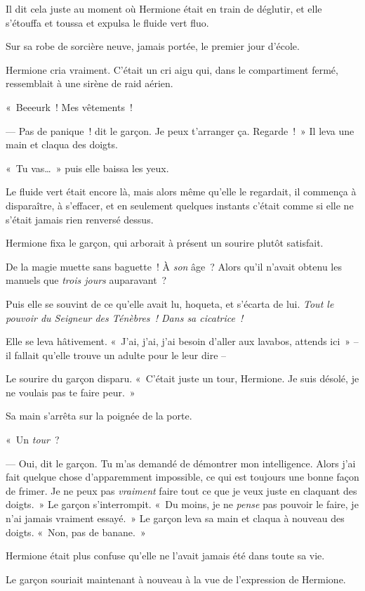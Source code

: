 Il dit cela juste au moment où Hermione était en train de déglutir, et elle s'étouffa et toussa et expulsa le fluide vert fluo.

Sur sa robe de sorcière neuve, jamais portée, le premier jour d'école.

Hermione cria vraiment. C'était un cri aigu qui, dans le compartiment fermé, ressemblait à une sirène de raid aérien.

«~Beeeurk~! Mes vêtements~!

--- Pas de panique~! dit le garçon. Je peux t'arranger ça. Regarde~!~» Il leva une main et claqua des doigts.

«~Tu vas…~» puis elle baissa les yeux.

Le fluide vert était encore là, mais alors même qu'elle le regardait, il commença à disparaître, à s'effacer, et en seulement quelques instants c'était comme si elle ne s'était jamais rien renversé dessus.

Hermione fixa le garçon, qui arborait à présent un sourire plutôt satisfait.

De la magie muette sans baguette~! À \emph{son} âge~? Alors qu'il n'avait obtenu les manuels que \emph{trois jours} auparavant~?

Puis elle se souvint de ce qu'elle avait lu, hoqueta, et s'écarta de lui. \emph{Tout le pouvoir du Seigneur des Ténèbres~! Dans sa cicatrice~!}

Elle se leva hâtivement. «~J'ai, j'ai, j'ai besoin d'aller aux lavabos, attends ici~» -- il fallait qu'elle trouve un adulte pour le leur dire --

Le sourire du garçon disparu. «~C'était juste un tour, Hermione. Je suis désolé, je ne voulais pas te faire peur.~»

Sa main s'arrêta sur la poignée de la porte.

«~Un \emph{tour}~?

--- Oui, dit le garçon. Tu m'as demandé de démontrer mon intelligence. Alors j'ai fait quelque chose d'apparemment impossible, ce qui est toujours une bonne façon de frimer. Je ne peux pas \emph{vraiment} faire tout ce que je veux juste en claquant des doigts.~» Le garçon s'interrompit. «~Du moins, je ne \emph{pense} pas pouvoir le faire, je n'ai jamais vraiment essayé.~» Le garçon leva sa main et claqua à nouveau des doigts. «~Non, pas de banane.~»

Hermione était plus confuse qu'elle ne l'avait jamais été dans toute sa vie.

Le garçon souriait maintenant à nouveau à la vue de l'expression de Hermione.

